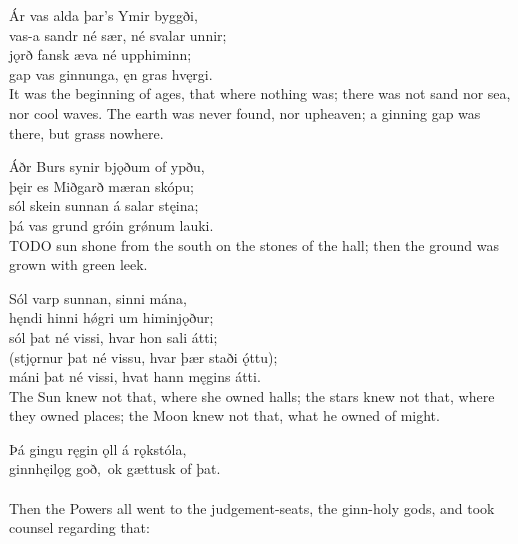 \bva Ár vas alda \hld þar's Ymir byggði,\footnotemark[6] \\%
vas-a sandr né sær, \hld né svalar unnir; \\%
jǫrð fansk æva \hld né upphiminn; \\%
gap vas ginnunga, \hld ęn gras hvęrgi.
\\%

\bvb It was the beginning of ages, that where nothing was\footnotemark[8]; there was not sand nor sea, nor cool waves. The earth was never found, nor upheaven; a ginning gap was there, but grass nowhere. 

\bva Áðr Burs synir \hld bjǫðum of ypðu, \\%
þęir es Miðgarð \hld mæran skópu; \\%
sól skein sunnan \hld á salar stęina; \\%
þá vas grund gróin \hld grǿnum lauki.\\%

\bvb TODO sun shone from the south on the stones of the hall; then the ground was grown with green leek.

\bva Sól varp sunnan, \hld sinni mána,\footnotemark[10] \\%
hęndi hinni hǿgri \hld um himinjǫður; \\%
sól þat né vissi, \hld hvar hon sali átti; \\%
(stjǫrnur þat né vissu, \hld hvar þær staði ǫ́ttu); \\%
máni þat né vissi, \hld hvat hann męgins átti.
\\%

\bvb The Sun knew not that, where she owned halls; the stars knew not that, where they owned places; the Moon knew not that, what he owned of might.

\bva Þá gingu ręgin ǫll \hld á rǫkstóla, \\%
ginnhęilǫg goð, \hld ok gættusk of þat.\footnotemark[20] \\%
\\%

\bvb Then the Powers all went to the judgement-seats, the ginn-holy gods, and took counsel regarding that:


